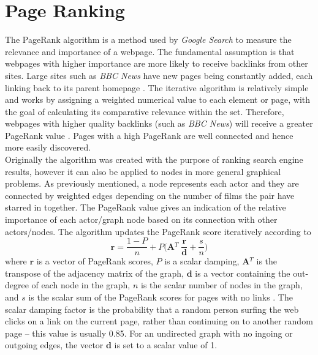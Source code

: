 \documentclass[12pt]{ieeeconf}      %
\begin{document}
\section{Page Ranking}
\indent The PageRank algorithm is a method used by \textit{Google Search} to measure the relevance and importance of a webpage.  The fundamental assumption is that webpages with higher importance are more likely to receive backlinks from other sites.  Large sites such as \textit{BBC News} have new pages being constantly added, each linking back to its parent homepage \cite{princeton}.  The iterative algorithm is relatively simple and works by assigning a weighted numerical value to each element or page, with the goal of calculating its comparative relevance within the set.  Therefore, webpages with higher quality backlinks (such as \textit{BBC News}) will receive a greater PageRank value \cite{checkpagerank}.  Pages with a high PageRank are well connected and hence more easily discovered.
\\
\indent Originally the algorithm was created with the purpose of ranking search engine results, however it can also be applied to nodes in more general graphical problems.  As previously mentioned, a node represents each actor and they are connected by weighted edges depending on the number of films the pair have starred in together.  The PageRank value gives an indication of the relative importance of each actor/graph node based on its connection with other actors/nodes.  The algorithm updates the PageRank score iteratively according to
\begin{equation}
\textbf{r} = \frac{1-P}{n} + P\Big(\textbf{A$^T$}\;\frac{\textbf{r}}{\textbf{d}}+\frac{s}{n}\Big)
\label{pagerank}
\end{equation}
where $\textbf{r}$ is a vector of PageRank scores, $P$ is a scalar damping, \textbf{A$^T$} is the transpose of the adjacency matrix of the graph, $\textbf{d}$ is a vector containing the out-degree of each node in the graph, $n$ is the scalar number of nodes in the graph, and $s$ is the scalar sum of the PageRank scores for pages with no links \cite{pagerank}.  The scalar damping factor is the probability that a random person surfing the web clicks on a link on the current page, rather than continuing on to another random page – this value is usually 0.85.  For an undirected graph with no ingoing or outgoing edges, the vector $\textbf{d}$ is set to a scalar value of 1.
\\
\end{document}
